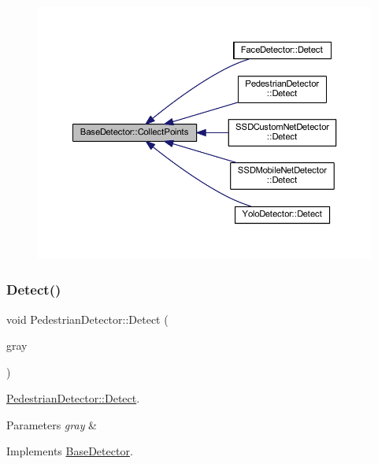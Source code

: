\begin{figure}[H]
\begin{center}
\leavevmode
\includegraphics[width=350pt]{class_base_detector_a20380b0980c6f262b0829f37fb89d2a7_icgraph}
\end{center}
\end{figure}
\mbox{\label{class_pedestrian_detector_a27a7c2c3b358f6e44a7de71f808597c2}} 
\subsubsection{\texorpdfstring{Detect()}{Detect()}}
{\footnotesize\ttfamily void Pedestrian\+Detector\+::\+Detect (\begin{DoxyParamCaption}\item[{cv\+::\+U\+Mat \&}]{gray }\end{DoxyParamCaption})\hspace{0.3cm}{\ttfamily [virtual]}}



\mbox{\hyperlink{class_pedestrian_detector_a27a7c2c3b358f6e44a7de71f808597c2}{Pedestrian\+Detector\+::\+Detect}}. 


\begin{DoxyParams}{Parameters}
{\em gray} & \\
\hline
\end{DoxyParams}


Implements \mbox{\hyperlink{class_base_detector_a9c9dedfffb7673fd2995f24bdb9ade18}{Base\+Detector}}.




